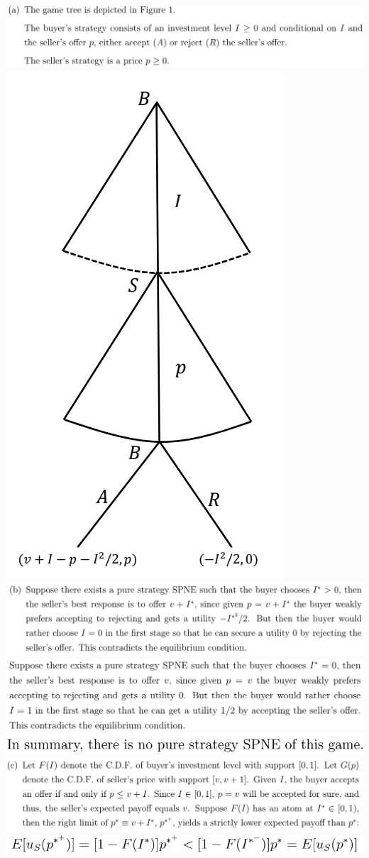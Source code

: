 \documentclass[8pt,landscape]{extarticle}
\begin{document}
\begin{multicols*}{3}
    \includegraphics[width=0.81\linewidth,keepaspectratio]{Screenshots/Screenshot 2024-03-11 195813.png}
    \includegraphics[width=0.26\linewidth,keepaspectratio]{Screenshots/Screenshot 2024-03-11 195821.png}
    \includegraphics[width=0.82\linewidth,keepaspectratio]{Screenshots/Screenshot 2024-03-11 195828.png}
    \includegraphics[width=0.78\linewidth,keepaspectratio]{Screenshots/Screenshot 2024-03-11 195835.png}
    \includegraphics[width=0.52\linewidth,keepaspectratio]{Screenshots/Screenshot 2024-03-11 195842.png}
    \includegraphics[width=0.81\linewidth,keepaspectratio]{Screenshots/Screenshot 2024-03-11 195849.png}
    \includegraphics[width=0.53\linewidth,keepaspectratio]{Screenshots/Screenshot 2024-03-11 195852.png}

\end{multicols*}
\end{document}
